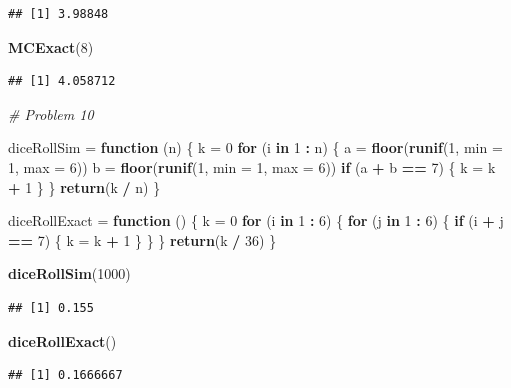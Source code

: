 \documentclass[
]{article}
\newenvironment{Shaded}{\begin{snugshade}}{\end{snugshade}}
\newcommand{\CommentTok}[1]{\textcolor[rgb]{0.56,0.35,0.01}{\textit{#1}}}
\newcommand{\ControlFlowTok}[1]{\textcolor[rgb]{0.13,0.29,0.53}{\textbf{#1}}}
\newcommand{\DataTypeTok}[1]{\textcolor[rgb]{0.13,0.29,0.53}{#1}}
\newcommand{\DecValTok}[1]{\textcolor[rgb]{0.00,0.00,0.81}{#1}}
\newcommand{\KeywordTok}[1]{\textcolor[rgb]{0.13,0.29,0.53}{\textbf{#1}}}
\newcommand{\NormalTok}[1]{#1}
\newcommand{\OperatorTok}[1]{\textcolor[rgb]{0.81,0.36,0.00}{\textbf{#1}}}
\newcommand{\StringTok}[1]{\textcolor[rgb]{0.31,0.60,0.02}{#1}}
\begin{document}
\begin{verbatim}
## [1] 3.98848
\end{verbatim}

\begin{Shaded}
\begin{Highlighting}[]
\KeywordTok{MCExact}\NormalTok{(}\DecValTok{8}\NormalTok{)}
\end{Highlighting}
\end{Shaded}

\begin{verbatim}
## [1] 4.058712
\end{verbatim}

\begin{Shaded}
\begin{Highlighting}[]
\CommentTok{# Problem 10}


\NormalTok{diceRollSim =}\StringTok{ }\ControlFlowTok{function}\NormalTok{ (n) \{}
\NormalTok{  k =}\StringTok{ }\DecValTok{0}
  \ControlFlowTok{for}\NormalTok{ (i }\ControlFlowTok{in} \DecValTok{1} \OperatorTok{:}\StringTok{ }\NormalTok{n) \{}
\NormalTok{    a =}\StringTok{ }\KeywordTok{floor}\NormalTok{(}\KeywordTok{runif}\NormalTok{(}\DecValTok{1}\NormalTok{, }\DataTypeTok{min =} \DecValTok{1}\NormalTok{, }\DataTypeTok{max =} \DecValTok{6}\NormalTok{))}
\NormalTok{    b =}\StringTok{ }\KeywordTok{floor}\NormalTok{(}\KeywordTok{runif}\NormalTok{(}\DecValTok{1}\NormalTok{, }\DataTypeTok{min =} \DecValTok{1}\NormalTok{, }\DataTypeTok{max =} \DecValTok{6}\NormalTok{))}
    \ControlFlowTok{if}\NormalTok{ (a }\OperatorTok{+}\StringTok{ }\NormalTok{b }\OperatorTok{==}\StringTok{ }\DecValTok{7}\NormalTok{) \{}
\NormalTok{      k =}\StringTok{ }\NormalTok{k }\OperatorTok{+}\StringTok{ }\DecValTok{1}
\NormalTok{    \}}
\NormalTok{  \}}
  \KeywordTok{return}\NormalTok{(k }\OperatorTok{/}\StringTok{ }\NormalTok{n)}
\NormalTok{\}}

\NormalTok{diceRollExact =}\StringTok{ }\ControlFlowTok{function}\NormalTok{ () \{}
\NormalTok{  k =}\StringTok{ }\DecValTok{0}
  \ControlFlowTok{for}\NormalTok{ (i }\ControlFlowTok{in} \DecValTok{1} \OperatorTok{:}\StringTok{ }\DecValTok{6}\NormalTok{) \{}
    \ControlFlowTok{for}\NormalTok{ (j }\ControlFlowTok{in} \DecValTok{1} \OperatorTok{:}\StringTok{ }\DecValTok{6}\NormalTok{) \{}
      \ControlFlowTok{if}\NormalTok{ (i }\OperatorTok{+}\StringTok{ }\NormalTok{j }\OperatorTok{==}\StringTok{ }\DecValTok{7}\NormalTok{) \{}
\NormalTok{        k =}\StringTok{ }\NormalTok{k }\OperatorTok{+}\StringTok{ }\DecValTok{1}
\NormalTok{      \}}
\NormalTok{    \}}
\NormalTok{  \}}
  \KeywordTok{return}\NormalTok{(k }\OperatorTok{/}\StringTok{ }\DecValTok{36}\NormalTok{)}
\NormalTok{\}}

\KeywordTok{diceRollSim}\NormalTok{(}\DecValTok{1000}\NormalTok{)}
\end{Highlighting}
\end{Shaded}

\begin{verbatim}
## [1] 0.155
\end{verbatim}

\begin{Shaded}
\begin{Highlighting}[]
\KeywordTok{diceRollExact}\NormalTok{()}
\end{Highlighting}
\end{Shaded}

\begin{verbatim}
## [1] 0.1666667
\end{verbatim}
\end{document}
